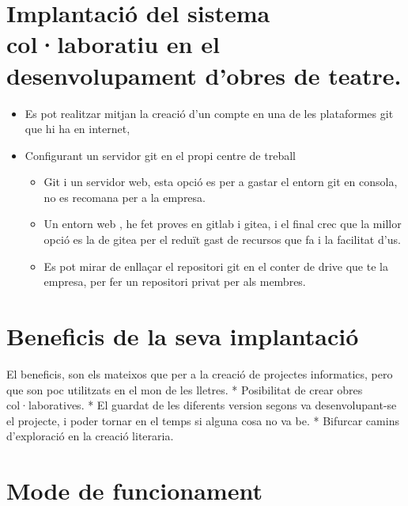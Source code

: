 \documentclass[
  10pt,
]{book}
\providecommand{\tightlist}{%
  \setlength{\itemsep}{0pt}\setlength{\parskip}{0pt}}
\begin{document}
\hypertarget{implantaciuxf3-del-sistema-collaboratiu-en-el-desenvolupament-dobres-de-teatre.}{%
\section{Implantació del sistema col·laboratiu en el desenvolupament d'obres de teatre.}\label{implantaciuxf3-del-sistema-collaboratiu-en-el-desenvolupament-dobres-de-teatre.}}

\begin{itemize}
\tightlist
\item
  Es pot realitzar mitjan la creació d'un compte en una de les plataformes git que hi ha en internet,
\item
  Configurant un servidor git en el propi centre de treball

  \begin{itemize}
  \tightlist
  \item
    Git i un servidor web, esta opció es per a gastar el entorn git en consola, no es recomana per a la empresa.
  \item
    Un entorn web , he fet proves en gitlab i gitea, i el final crec que la millor opció es la de gitea per el reduït gast de recursos que fa i la facilitat d'us.
  \item
    Es pot mirar de enllaçar el repositori git en el conter de drive que te la empresa, per fer un repositori privat per als membres.
  \end{itemize}
\end{itemize}

\hypertarget{beneficis-de-la-seva-implantaciuxf3}{%
\section{Beneficis de la seva implantació}\label{beneficis-de-la-seva-implantaciuxf3}}

El beneficis, son els mateixos que per a la creació de projectes informatics, pero que son poc utilitzats en el mon de les lletres. * Posibilitat de crear obres col·laboratives. * El guardat de les diferents version segons va desenvolupant-se el projecte, i poder tornar en el temps si alguna cosa no va be. * Bifurcar camins d'exploració en la creació literaria.

\hypertarget{mode-de-funcionament}{%
\section{Mode de funcionament}\label{mode-de-funcionament}}
\end{document}
